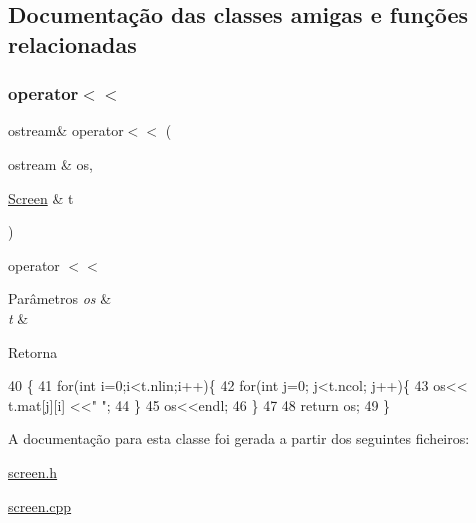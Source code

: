 \subsection{Documentação das classes amigas e funções relacionadas}
\mbox{\label{class_screen_aab6a2880746bfe1b7964817cc8f0989e}} 
\subsubsection{\texorpdfstring{operator$<$$<$}{operator<<}}
{\footnotesize\ttfamily ostream\& operator$<$$<$ (\begin{DoxyParamCaption}\item[{ostream \&}]{os,  }\item[{\hyperlink{class_screen}{Screen} \&}]{t }\end{DoxyParamCaption})\hspace{0.3cm}{\ttfamily [friend]}}



operator $<$$<$ 


\begin{DoxyParams}{Parâmetros}
{\em os} & \\
\hline
{\em t} & \\
\hline
\end{DoxyParams}
\begin{DoxyReturn}{Retorna}

\end{DoxyReturn}

\begin{DoxyCode}
40                                            \{
41     \textcolor{keywordflow}{for}(\textcolor{keywordtype}{int} i=0;i<t.nlin;i++)\{
42         \textcolor{keywordflow}{for}(\textcolor{keywordtype}{int} j=0; j<t.ncol; j++)\{
43             os<< t.mat[j][i] <<\textcolor{stringliteral}{" "};
44         \}
45         os<<endl;
46     \}
47 
48     \textcolor{keywordflow}{return} os;
49 \}
\end{DoxyCode}


A documentação para esta classe foi gerada a partir dos seguintes ficheiros\+:\begin{DoxyCompactItemize}
\item 
\hyperlink{screen_8h}{screen.\+h}\item 
\hyperlink{screen_8cpp}{screen.\+cpp}\end{DoxyCompactItemize}
